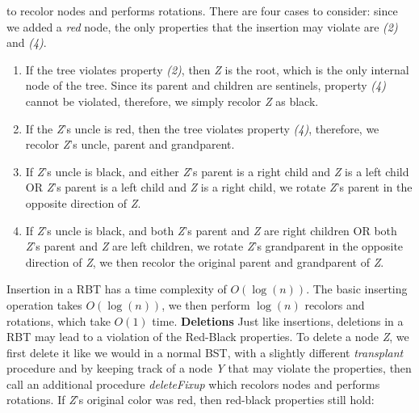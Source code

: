 \documentclass[12pt]{article}
\begin{document}
to recolor nodes and performs rotations. \newline
There are four cases to consider: since we added a \textit{red} node, the only properties that the insertion may violate
are \textit{(2)} and \textit{(4)}.
\begin{enumerate}
    \item If the tree violates property \textit{(2)}, then \textit{Z} is the root, which is the only internal
    node of the tree.
    Since its parent and children are sentinels, property \textit{(4)} cannot be violated, therefore, we simply recolor
    \textit{Z} as black.
    \item If the \textit{Z}'s uncle is red, then the tree violates property \textit{(4)}, therefore, we recolor
    \textit{Z}'s uncle, parent and grandparent.
    \item If \textit{Z}'s uncle is black, and either \textit{Z}'s parent is a right child and \textit{Z} is a left child
    OR \textit{Z}'s parent is a left child and \textit{Z} is a right child, we rotate \textit{Z}'s parent in
    the opposite direction of \textit{Z}.
    \item If \textit{Z}'s uncle is black, and both \textit{Z}'s parent and \textit{Z} are right children OR
    both \textit{Z}'s parent and \textit{Z} are left children, we rotate \textit{Z}'s grandparent in the opposite
    direction of \textit{Z}, we then recolor the original parent and grandparent of \textit{Z}.
\end{enumerate}
    Insertion in a RBT has a time complexity of $O(\log(n))$. \newline
    The basic inserting operation takes $O(\log(n))$, we then perform $\log(n)$ recolors and rotations,
    which take $O(1)$ time. \newline \newline \newline
\textbf{Deletions} \newline \newline
Just like insertions, deletions in a RBT may lead to a violation of the Red-Black properties. \newline
To delete a node \textit{Z}, we first delete it like we would in a normal BST, with a slightly different
    \textit{transplant} procedure and by keeping track of a node \textit{Y} that may violate the properties, then
    call an additional procedure \textit{deleteFixup} which recolors nodes and performs rotations. \newline
If \textit{Z}'s original color was red, then red-black properties still hold:
\end{document}
